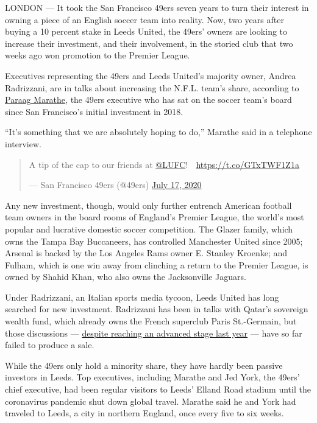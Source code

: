 LONDON --- It took the San Francisco 49ers seven years to turn their
interest in owning a piece of an English soccer team into reality. Now,
two years after buying a 10 percent stake in Leeds United, the 49ers'
owners are looking to increase their investment, and their involvement,
in the storied club that two weeks ago won promotion to the Premier
League.

Executives representing the 49ers and Leeds United's majority owner,
Andrea Radrizzani, are in talks about increasing the N.F.L. team's
share, according to
\href{https://www.49ers.com/team/front-office-roster/paraag-marathe}{Paraag
Marathe}, the 49ers executive who has sat on the soccer team's board
since San Francisco's initial investment in 2018.

``It's something that we are absolutely hoping to do,'' Marathe said in
a telephone interview.

\begin{quote}
A tip of the cap to our friends at
\href{https://twitter.com/LUFC?ref_src=twsrc\%5Etfw}{@LUFC}! 👏
\url{https://t.co/GTxTWF1Z1a}

--- San Francisco 49ers (@49ers)
\href{https://twitter.com/49ers/status/1284236719890460673?ref_src=twsrc\%5Etfw}{July
17, 2020}
\end{quote}

Any new investment, though, would only further entrench American
football team owners in the board rooms of England's Premier League, the
world's most popular and lucrative domestic soccer competition. The
Glazer family, which owns the Tampa Bay Buccaneers, has controlled
Manchester United since 2005; Arsenal is backed by the Los Angeles Rams
owner E. Stanley Kroenke; and Fulham, which is one win away from
clinching a return to the Premier League, is owned by Shahid Khan, who
also owns the Jacksonville Jaguars.

Under Radrizzani, an Italian sports media tycoon, Leeds United has long
searched for new investment. Radrizzani has been in talks with Qatar's
sovereign wealth fund, which already owns the French superclub Paris
St.-Germain, but those discussions ---
\href{https://www.nytimes3xbfgragh.onion/2019/06/03/sports/qatar-may-buy-into-english-team-leeds.html}{despite
reaching an advanced stage last year} --- have so far failed to produce
a sale.

While the 49ers only hold a minority share, they have hardly been
passive investors in Leeds. Top executives, including Marathe and Jed
York, the 49ers' chief executive, had been regular visitors to Leeds'
Elland Road stadium until the coronavirus pandemic shut down global
travel. Marathe said he and York had traveled to Leeds, a city in
northern England, once every five to six weeks.

